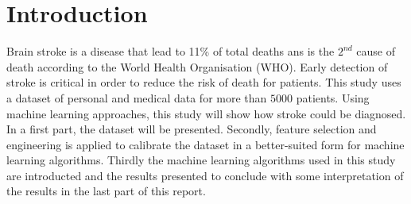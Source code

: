 \section{Introduction}
Brain stroke is a disease that lead to 11\% of total deaths ans is the $2^{nd}$ cause of death 
according to the World Health Organisation (WHO). Early detection of stroke is critical in order to 
reduce the risk of death for patients. This study uses a dataset of personal and medical data for 
more than $5000$ patients. Using machine learning approaches, this study will show how stroke could 
be diagnosed.\\

In a first part, the dataset will be presented. Secondly, feature selection and engineering is 
applied to calibrate the dataset in a better-suited form for machine learning algorithms. Thirdly the 
machine learning algorithms used in this study are introducted and the results presented to conclude 
with some interpretation of the results in the last part of this report.
